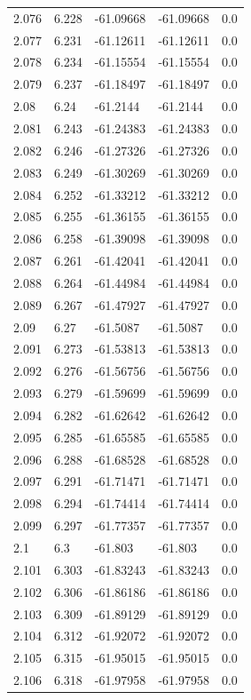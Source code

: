 \begin{tabular}{lllll}
2.076 & 6.228 & -61.09668 & -61.09668 & 0.0 \\
2.077 & 6.231 & -61.12611 & -61.12611 & 0.0 \\
2.078 & 6.234 & -61.15554 & -61.15554 & 0.0 \\
2.079 & 6.237 & -61.18497 & -61.18497 & 0.0 \\
2.08 & 6.24 & -61.2144 & -61.2144 & 0.0 \\
2.081 & 6.243 & -61.24383 & -61.24383 & 0.0 \\
2.082 & 6.246 & -61.27326 & -61.27326 & 0.0 \\
2.083 & 6.249 & -61.30269 & -61.30269 & 0.0 \\
2.084 & 6.252 & -61.33212 & -61.33212 & 0.0 \\
2.085 & 6.255 & -61.36155 & -61.36155 & 0.0 \\
2.086 & 6.258 & -61.39098 & -61.39098 & 0.0 \\
2.087 & 6.261 & -61.42041 & -61.42041 & 0.0 \\
2.088 & 6.264 & -61.44984 & -61.44984 & 0.0 \\
2.089 & 6.267 & -61.47927 & -61.47927 & 0.0 \\
2.09 & 6.27 & -61.5087 & -61.5087 & 0.0 \\
2.091 & 6.273 & -61.53813 & -61.53813 & 0.0 \\
2.092 & 6.276 & -61.56756 & -61.56756 & 0.0 \\
2.093 & 6.279 & -61.59699 & -61.59699 & 0.0 \\
2.094 & 6.282 & -61.62642 & -61.62642 & 0.0 \\
2.095 & 6.285 & -61.65585 & -61.65585 & 0.0 \\
2.096 & 6.288 & -61.68528 & -61.68528 & 0.0 \\
2.097 & 6.291 & -61.71471 & -61.71471 & 0.0 \\
2.098 & 6.294 & -61.74414 & -61.74414 & 0.0 \\
2.099 & 6.297 & -61.77357 & -61.77357 & 0.0 \\
2.1 & 6.3 & -61.803 & -61.803 & 0.0 \\
2.101 & 6.303 & -61.83243 & -61.83243 & 0.0 \\
2.102 & 6.306 & -61.86186 & -61.86186 & 0.0 \\
2.103 & 6.309 & -61.89129 & -61.89129 & 0.0 \\
2.104 & 6.312 & -61.92072 & -61.92072 & 0.0 \\
2.105 & 6.315 & -61.95015 & -61.95015 & 0.0 \\
2.106 & 6.318 & -61.97958 & -61.97958 & 0.0 \\

\end{tabular}

